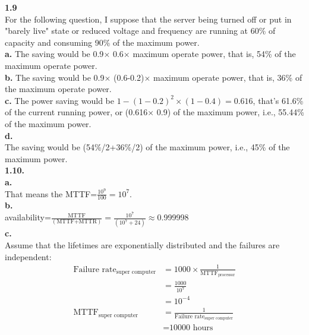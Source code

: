 \documentclass{article}
\begin{document}
\noindent \textbf{1.9}\\
For the following question, I suppose that the server being turned off or put in "barely live" state or reduced voltage and frequency are running at 60\% of capacity and consuming 90\% of the maximum power.\\
\indent \textbf{a.} The saving would be 0.9$\times$ 0.6$\times$ maximum operate power, that is, 54\% of the maximum operate power.\\
\indent \textbf{b.}
The saving would be 0.9$\times$ (0.6-0.2)$\times$ maximum operate power, that is, 36\% of the maximum operate power.\\
\indent \textbf{c.} The power saving would be $1-{(1-0.2)}^2\times(1-0.4)=0.616$, that's 61.6\% of the current running power, or (0.616$\times$ 0.9) of the maximum power, i.e., 55.44\% of the maximum power.\\
\indent \textbf{d.}\\
The saving would be (54\%/2+36\%/2) of the maximum power, i.e., 45\% of the maximum power.\\

\noindent \textbf{1.10.}\\
\indent \textbf{a.}\\
\indent That means the MTTF=$\frac{10^9}{100}=10^7$.\\
\indent \textbf{b.}\\
\indent availability=$\frac{\text{MTTF}}{(\text{MTTF+MTTR})}=\frac{10^7}{(10^7+24)}\approx$0.999998\\
\indent \textbf{c.}\\
\indent Assume that the lifetimes are exponentially distributed and the failures are independent:
\begin{align*}
    \text{Failure rate}_{\text{super computer}}&=1000\times \frac{1}{\text{MTTF}_\text{processor}}\\
    &=\frac{1000}{10^7}\\
    &=10^{-4}\\
    \text{MTTF}_\text{super computer}&=\frac{1}{\text{Failure rate}_{\text{super computer}}}\\
    &=\text{10000 hours}
\end{align*}
\end{document}
